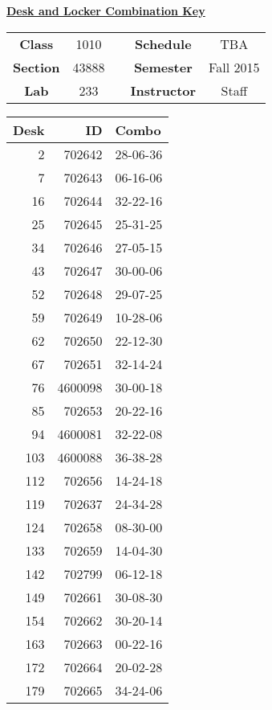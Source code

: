 \documentclass[12pt]{article}
\begin{document}
\thispagestyle{empty}

\begin{center}
	{\huge\textbf{\underline{ Desk and Locker Combination Key}}}
\end{center}


\begin{table}[h]
  \centering
  \begin{tabular}{ccccc}

  \textbf{Class} & 1010 & {\qquad} &\textbf{Schedule} & TBA \\
  \textbf{Section} & 43888 & {\qquad} & \textbf{Semester} & Fall 2015 \\
  \textbf{Lab} & 233 & {\qquad} & \textbf{Instructor} & Staff \\
  \end{tabular}
\end{table}
 \vspace{0.5in}
\begin{minipage}{0.4\textwidth}

\begin{tabular}{rrl}
\toprule
 Desk &       ID &     Combo \\
\midrule
    2 &   702642 &  28-06-36 \\
    7 &   702643 &  06-16-06 \\
   16 &   702644 &  32-22-16 \\
   25 &   702645 &  25-31-25 \\
   34 &   702646 &  27-05-15 \\
   43 &   702647 &  30-00-06 \\
   52 &   702648 &  29-07-25 \\
   59 &   702649 &  10-28-06 \\
   62 &   702650 &  22-12-30 \\
   67 &   702651 &  32-14-24 \\
   76 &  4600098 &  30-00-18 \\
   85 &   702653 &  20-22-16 \\
   94 &  4600081 &  32-22-08 \\
  103 &  4600088 &  36-38-28 \\
  112 &   702656 &  14-24-18 \\
  119 &   702637 &  24-34-28 \\
  124 &   702658 &  08-30-00 \\
  133 &   702659 &  14-04-30 \\
  142 &   702799 &  06-12-18 \\
  149 &   702661 &  30-08-30 \\
  154 &   702662 &  30-20-14 \\
  163 &   702663 &  00-22-16 \\
  172 &   702664 &  20-02-28 \\
  179 &   702665 &  34-24-06 \\
\bottomrule
\end{tabular}


\end{minipage}
\end{document}
